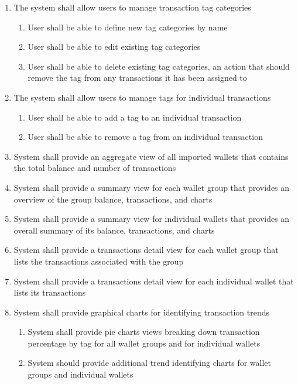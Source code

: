 \begin{adjustwidth}{1.5em}{0pt}
\begin{enumerate}[label=3.\arabic*]
		\item The system shall allow users to manage transaction tag categories
      \begin{enumerate}[label*=.\arabic*.]
			\item User shall be able to define new tag categories by name
			\item User shall be able to edit existing tag categories
			\item User shall be able to delete existing tag categories, an action that should remove the tag from any transactions it has been assigned to
		\end{enumerate}
		
		\item The system shall allow users to manage tags for individual transactions
      \begin{enumerate}[label*=.\arabic*.]
			\item User shall be able to add a tag to an individual transaction
			\item User shall be able to remove a tag from an individual transaction
		\end{enumerate}

		\item System shall provide an aggregate view of all imported wallets that contains the total balance and number of transactions
		
		\item System shall provide a summary view for each wallet group that provides an overview of the group balance, transactions, and charts
		
		\item System shall provide a summary view for individual wallets that provides an overall summary of its balance, transactions, and charts
		
		\item System shall provide a transactions detail view for each wallet group that lists the transactions associated with the group
				
		\item System shall provide a transactions detail view for each individual wallet that lists its transactions
		
		\item System shall provide graphical charts for identifying transaction trends
      \begin{enumerate}[label*=.\arabic*.]
			\item System shall provide pie charts views breaking down transaction percentage by tag for all wallet groups and for individual wallets
			\item System should provide additional trend identifying charts for wallet groups and individual wallets
		\end{enumerate}
		

\end{enumerate}
\end{adjustwidth}
